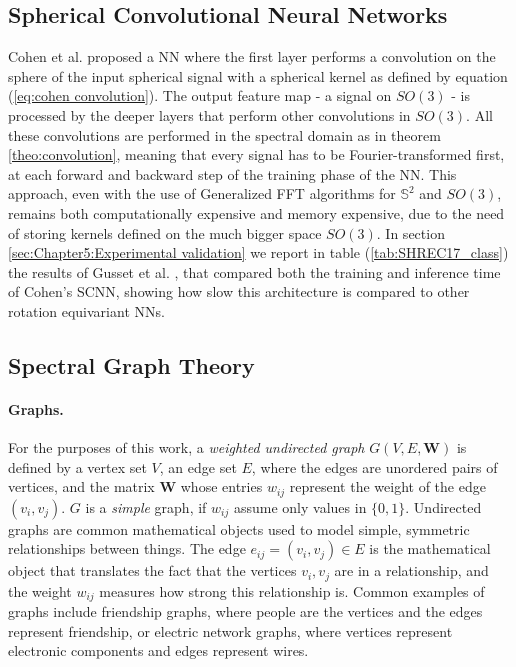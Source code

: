\subsection{Spherical Convolutional Neural Networks}\label{sec:Chapter1:SCNN}
Cohen et al. \cite{SCNN} proposed a NN where the first layer performs a convolution on the sphere of the input spherical signal with a spherical kernel as defined by equation (\ref{eq:cohen convolution}). The output feature map - a signal on $SO(3)$ - is processed by the deeper layers that perform other convolutions in $SO(3)$. All these convolutions are performed in the spectral domain as in theorem \ref{theo:convolution}, meaning that every signal has to be Fourier-transformed first, at each forward and backward step of the training phase of the NN. This approach, even with the use of Generalized FFT algorithms for $\mathbb S^2$ and $SO(3)$, remains both computationally expensive and memory expensive, due to the need of storing kernels defined on the much bigger space $SO(3)$. In section \ref{sec:Chapter5:Experimental validation} we report in table (\ref{tab:SHREC17_class}) the results of Gusset et al. \cite{Gusset}, that compared both the training and inference time of Cohen's SCNN, showing how slow this architecture is compared to other rotation equivariant NNs.
\subsection{Spectral Graph Theory} \label{sec:Chapter1: Spectral Graph Theory}
\paragraph{Graphs.}
For the purposes of this work, a \textit{weighted undirected graph} $G(V, E, \mathbf W)$ is defined by a vertex set $V$, an edge set $E$, where the edges are unordered pairs of vertices, and the matrix $\mathbf W$ whose entries $w_{ij}$ represent the weight of the edge $(v_i, v_j)$. $G$ is a \textit{simple} graph, if $w_{ij}$ assume only values in $\{0, 1\}$. Undirected graphs are common mathematical objects used to model simple, symmetric relationships between things. The edge $e_{ij} = (v_i, v_j) \in E$ is the mathematical object that translates the fact that the vertices $v_i, v_j$ are in a relationship, and the weight $w_{ij}$ measures how strong this relationship is. Common examples of graphs include friendship graphs, where people are the vertices and the edges represent friendship, or electric network graphs, where vertices represent electronic components and edges represent wires.
